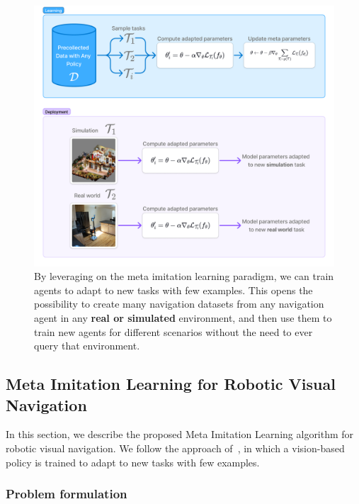 \begin{figure}
    \centering
    \includegraphics[width=\linewidth]{figures/metanav/graphical_abstract}
    \caption{
        By leveraging on the meta imitation learning paradigm, we can train agents to adapt to new tasks with few examples.
        This opens the possibility to create many navigation datasets from any navigation agent in any \textbf{real or simulated} environment, and then use them to train new agents for different scenarios without the need to ever query that environment.
    }
    \label{fig:abstract_metanav}
\end{figure}

\subsection{Meta Imitation Learning for Robotic Visual Navigation}\label{subsec:meta-imitation-learning-for-robotic-visual-navigation}

In this section, we describe the proposed Meta Imitation Learning algorithm for robotic visual navigation.
We follow the approach of~\cite{finnOneShotVisualImitation2017}, in which a vision-based policy is trained to adapt to new tasks with few examples.

\subsubsection{Problem formulation}\label{subsubsec:problem-formulation}

